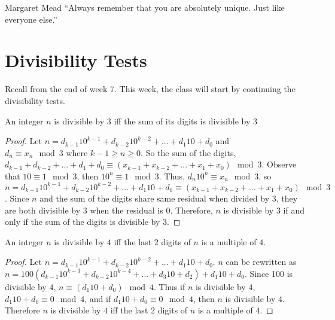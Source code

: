\newtheorem{lemma}[theorem]{Lemma}

\newenvironment{remark}[1][Remark]{\begin{trivlist}
\item[\hskip \labelsep {\bfseries #1}]}{\end{trivlist}}

\renewcommand{\qed}{\nobreak \ifvmode \relax \else
      \ifdim\lastskip<1.5em \hskip-\lastskip
      \hskip1.5em plus0em minus0.5em \fi \nobreak
      \vrule height0.75em width0.5em depth0.25em\fi}

\begin{chapquote}{Margaret Mead}
``Always remember that you are absolutely unique. Just like everyone else.''
\end{chapquote}

\section{Divisibility Tests}

Recall from the end of week 7. This week, the class will start by continuing the divisibility tests. 
\begin{theorem}
An integer $n$ is divisible by $3$ iff the sum of its digits is divisible by $3$
\end{theorem}

\begin{proof}
Let $n = d_{k-1}10^{k-1} + d_{k-2}10^{k-2} + ... + d_{1}10 + d_{0}$ and\\ $d_n \equiv x_n \mod3$ where $k-1 \geq n \geq 0$. So the sum of the digits, $d_{k-1} + d_{k-2}+ ... + d_{1}+ d_{0} \equiv (x_{k-1} + x_{k-2} + ... + x_1 + x_0) \mod 3$. Observe that $10 \equiv 1 \mod 3$, then $10^n \equiv 1 \mod 3$. Thus, $d_n10^n \equiv x_n \mod3$, so $n = d_{k-1}10^{k-1} + d_{k-2}10^{k-2} + ... + d_{1}10 + d_{0} \equiv (x_{k-1} + x_{k-2} + ... + x_1 + x_0) \mod 3$. Since $n$ and the sum of the digits share same residual when divided by $3$, they are both divisible by $3$ when the residual is $0$. Therefore, $n$ is divisible by $3$ if and only if the sum of the digits is divisible by $3$.
\end{proof}

\begin{theorem}
An integer $n$ is divisible by $4$ iff the last 2 digits of $n$ is a multiple of $4$.
\end{theorem}

\begin{proof}
Let $n = d_{k-1}10^{k-1} + d_{k-2}10^{k-2} + ... + d_{1}10 + d_{0}$. $n$ can be rewritten as $n = 100(d_{k-1}10^{k-3} + d_{k-2}10^{k-4} + ... + d_{3}10 + d_{2}) + d_{1}10 + d_{0}$. Since 100 is divisible by $4$, $n \equiv (d_{1}10 + d_{0}) \mod 4$. Thus if $n$ is divisible by $4$, $d_{1}10 + d_{0} \equiv 0 \mod 4$, and if $d_{1}10 + d_{0} \equiv 0 \mod 4$, then $n$ is divisible by $4$. Therefore $n$ is divisible by $4$ iff the last 2 digits of $n$ is a multiple of $4$.
\end{proof}

